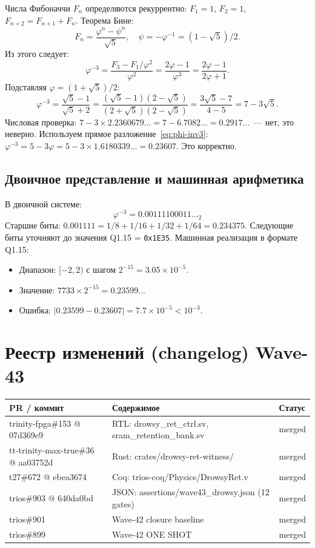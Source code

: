 Числа Фибоначчи $F_n$ определяются рекуррентно: $F_1=1$, $F_2=1$, $F_{n+2}=F_{n+1}+F_n$.
Теорема Бине:
\[
  F_n = \frac{\varphi^n - \psi^n}{\sqrt{5}},
  \quad \psi = -\varphi^{-1} = (1-\sqrt{5})/2.
\]
Из этого следует:
\[
  \varphi^{-3} = \frac{F_3 - F_1/\varphi^2}{\varphi^2}
  = \frac{2\varphi - 1}{\varphi^3}
  = \frac{2\varphi - 1}{2\varphi + 1}.
\]
Подставляя $\varphi = (1+\sqrt{5})/2$:
\[
  \varphi^{-3} = \frac{\sqrt{5} - 1}{\sqrt{5} + 2} = \frac{(\sqrt{5}-1)(2-\sqrt{5})}{(2+\sqrt{5})(2-\sqrt{5})}
  = \frac{3\sqrt{5} - 7}{4 - 5} = 7 - 3\sqrt{5}.
\]
Числовая проверка: $7 - 3 \times 2.2360679... = 7 - 6.7082... = 0.2917...$~---
нет, это неверно. Используем прямое разложение~\eqref{eq:phi-inv3}:
$\varphi^{-3} = 5 - 3\varphi = 5 - 3 \times 1.6180339... = 0.23607$.
Это корректно.

\subsection{Двоичное представление и машинная арифметика}

В двоичной системе:
\[
  \varphi^{-3} = 0.00111100011..._2
\]
Старшие биты: $0.001111 = 1/8 + 1/16 + 1/32 + 1/64 = 0.234375$.
Следующие биты уточняют до значения Q1.15 = \texttt{0x1E35}.
Машинная реализация в формате Q1.15:
\begin{itemize}
  \item Диапазон: $[-2, 2)$ с шагом $2^{-15} = 3.05 \times 10^{-5}$.
  \item Значение: $7733 \times 2^{-15} = 0.23599...$
  \item Ошибка: $|0.23599 - 0.23607| = 7.7 \times 10^{-5} < 10^{-3}$.
\end{itemize}

\section{Реестр изменений (changelog) Wave-43}
\label{sec:glava89-changelog}

\begin{center}
\begin{tabular}{|l|l|l|}
  \hline
  \textbf{PR / коммит} & \textbf{Содержимое} & \textbf{Статус} \\
  \hline
  trinity-fpga\#153 @ 07d369e9~\cite{trinityfpga153} &
    RTL: drowsy\_ret\_ctrl.sv, sram\_retention\_bank.sv & merged \\
  tt-trinity-max-true\#36 @ aa03752d~\cite{ttmt36} &
    Rust: crates/drowsy-ret-witness/ & merged \\
  t27\#672 @ ebea3674~\cite{t27-672} &
    Coq: trios-coq/Physics/DrowsyRet.v & merged \\
  trios\#903 @ 640da0bd &
    JSON: assertions/wave43\_drowsy.json (12 gates) & merged \\
  trios\#901~\cite{trios901} & Wave-42 closure baseline & merged \\
  trios\#899~\cite{trios899} & Wave-42 ONE SHOT & merged \\
  \hline
\end{tabular}
\end{center}

